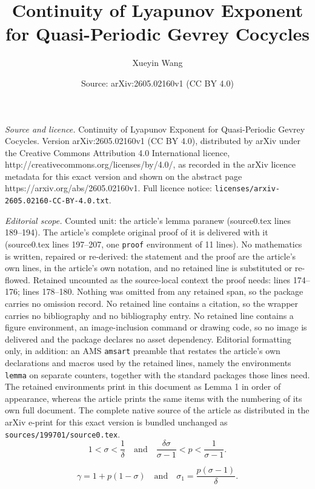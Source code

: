 \documentclass[10pt,a4paper]{amsart}
\title{Continuity of Lyapunov Exponent for Quasi-Periodic Gevrey Cocycles}
\author{Xueyin Wang}
\date{Source: arXiv:2605.02160v1 (CC BY 4.0)}
\begin{document}
\maketitle

\noindent\emph{Source and licence.} Continuity of Lyapunov Exponent for Quasi-Periodic Gevrey Cocycles. Version arXiv:2605.02160v1 (CC BY 4.0), distributed by arXiv under the Creative Commons Attribution 4.0 International licence, http://creativecommons.org/licenses/by/4.0/, as recorded in the arXiv licence metadata for this exact version and shown on the abstract page https://arxiv.org/abs/2605.02160v1. Full licence notice: \texttt{licenses/arxiv-2605.02160-CC-BY-4.0.txt}.\par\smallskip

\noindent\textit{Editorial scope.} Counted unit: the article's lemma paranew (source0.tex lines 189--194). The article's complete original proof of it is delivered with it (source0.tex lines 197--207, one \texttt{proof} environment of 11 lines). No mathematics is written, repaired or re-derived: the statement and the proof are the article's own lines, in the article's own notation, and no retained line is substituted or re-flowed.  Retained uncounted as the source-local context the proof needs: lines 174--176; lines 178--180.  Nothing was omitted from any retained span, so the package carries no omission record.  No retained line contains a citation, so the wrapper carries no bibliography and no bibliography entry.  No retained line contains a figure environment, an image-inclusion command or drawing code, so no image is delivered and the package declares no asset dependency.  Editorial formatting only, in addition: an AMS \texttt{amsart} preamble that restates the article's own declarations and macros used by the retained lines, namely the environments \texttt{lemma} on separate counters, together with the standard packages those lines need.  The retained environments print in this document as Lemma 1 in order of appearance, whereas the article prints the same items with the numbering of its own full document.  The complete native source of the article as distributed in the arXiv e-print for this exact version is bundled unchanged as \texttt{sources/199701/source0.tex}.
    \begin{equation}\label{p1}
        1<\sigma<\frac{1}{\delta}\quad \text{and}\quad \frac{\delta\sigma}{\sigma-1}<p<\frac{1}{\sigma-1}.
    \end{equation}

    \begin{equation}\label{p2}
        \gamma=1+p(1-\sigma)\quad \text{and}\quad \sigma_{1}=\frac{p(\sigma-1)}{\delta}.
    \end{equation}
\end{document}
